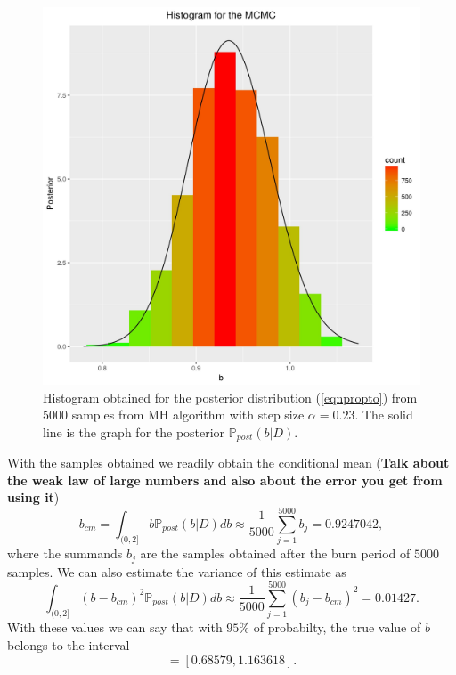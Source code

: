 \documentclass[12pt]{book}
\newcommand{\post}{\mathbb{P}_{post}}
\begin{document}
%


\begin{figure}[H]
\centering
\includegraphics[scale=0.8]{./FigChap3/histogram_mcmc.jpg}
\caption{Histogram obtained for the posterior distribution (\ref{eqnpropto}) 
from $5000$ samples from MH algorithm with step size $\alpha=0.23$. The solid line
is the  graph for the posterior $\post(b|D)$.}
\end{figure}

With the samples obtained we readily obtain the conditional mean (\textbf{Talk about the weak law of large numbers
and also about the error you get from using it})
\begin{equation*}
b_{cm}=\int_{(0,2]}b\post(b|D)db\approx\frac{1}{5000}\sum_{j=1}^{5000}b_{j}=0.9247042,
\end{equation*}
where the summands $b_{j}$ are the samples obtained after the burn period of $5000$ samples. We can 
also estimate the variance of this estimate as 
\begin{equation*}
\int_{(0,2]}(b-b_{cm})^{2}\post(b|D)db\approx\frac{1}{5000}\sum_{j=1}^{5000}(b_{j}-b_{cm})^{2}=0.01427.
\end{equation*}
With these values we can say that with $95\%$ of probabilty, the true value of $b$ belongs to the
interval
\begin{equation*}
[0.9247042-2\sqrt{0.01427},0.92470422+2\sqrt{0.01427}]=[0.68579,1.163618].
\end{equation*}
\end{document}
